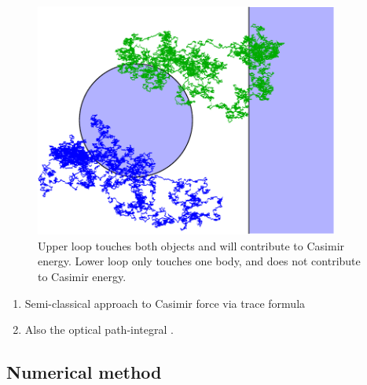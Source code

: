 \begin{figure}
\center
\includegraphics[width=10cm]{fig/intro/hit_strong_coupling}
\caption[Schematic of worldline paths interacting with plane and sphere]
{Upper loop touches both objects and will contribute to Casimir energy.
  Lower loop only touches one body, and does not contribute to Casimir energy.}
\end{figure}

\begin{enumerate}
  \item Semi-classical approach to Casimir force via trace formula~\cite{Schaden1998}
  \item Also the optical path-integral \cite{Scardicchio2005, Scardicchio2006}.
\end{enumerate}

\subsection{Numerical method}

